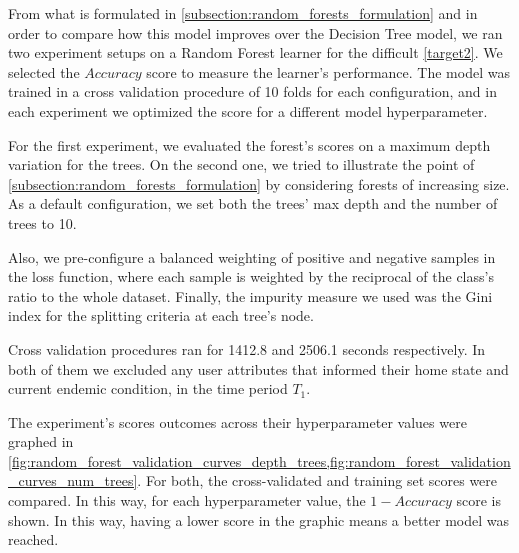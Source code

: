From what is formulated in \cref{subsection:random_forests_formulation} and in order to compare how this model improves over the Decision Tree model, we ran two experiment setups on a Random Forest learner for the difficult  \cref{target2}.
We selected the $Accuracy$ score to measure the learner's performance.
The model was trained in a cross validation procedure of 10 folds for each configuration, and in each experiment we optimized the score for a different model hyperparameter.

For the first experiment, we evaluated the forest's scores on a maximum depth variation for the trees.
On the second one, we tried to illustrate the point of \cref{subsection:random_forests_formulation} by considering forests of increasing size.
As a default configuration, we set both the trees' max depth and the number of trees to 10.

Also, we pre-configure a balanced weighting of positive and negative samples in the loss function, where each sample is weighted by the reciprocal of the class's ratio to the whole dataset.
Finally, the impurity measure we used was the Gini index for the splitting criteria at each tree's node.

Cross validation procedures ran for 1412.8 and 2506.1 seconds respectively.
In both of them we excluded any user attributes that informed their home state and current endemic condition, in the time period $T_1$.

The experiment's scores outcomes across their hyperparameter values were graphed in \cref{fig:random_forest_validation_curves_depth_trees,fig:random_forest_validation_curves_num_trees}.
For both, the cross-validated and training set scores were compared. In this way, for each hyperparameter value, the $1-Accuracy$ score is shown.
In this way, having a lower score in the graphic means a better model was reached.

